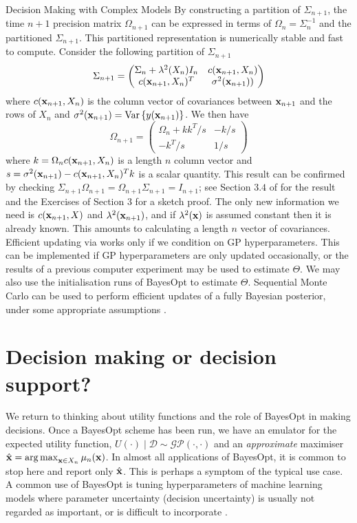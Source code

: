 \begin{chapter}{Decision Making with Complex Models \label{Chap:optimisation}}
By constructing a partition of $\Sigma_{n+1}$, the time $n+1$ precision matrix $\Omega_{n+1}$ can be expressed in terms of $\Omega_n = \Sigma_n^{-1}$ and the partitioned $\Sigma_{n+1}$. This partitioned representation is numerically stable and fast to compute. Consider the following partition of $\Sigma_{n+1}$
 \begin{equation}
 \Sigma_{n+1} = \begin{pmatrix}
         \Sigma_n + \lambda^2(X_n)I_n & c(\mathbf{x}_{n+1}, X_n) \\
         c(\mathbf{x}_{n+1}, X_n)^T & \sigma^2(\mathbf{x}_{n+1}))
         \end{pmatrix}
 \end{equation}
 where $c(\mathbf{x}_{n+1}, X_n)$ is the column vector of covariances between $\mathbf{x}_{n+1}$ and the rows of $X_n$ and $\sigma^2(\mathbf{x}_{n+1}) = \mathrm{Var}\,\{ y(\mathbf{x}_{n+1}) \}$. We then have
\begin{equation}
 \Omega_{n+1} = \begin{pmatrix}
         \Omega_n + k k^T /s & -k/s \\
         -k^T/s & 1/s
         \end{pmatrix} \label{Eq:omega-n1}
\end{equation}
where $k = \Omega_n c(\mathbf{x}_{n+1}, X_n)$ is a length $n$ column vector and $s = \sigma^2(\mathbf{x}_{n+1}) - c(\mathbf{x}_{n+1}, X_n)^T k$ is a scalar quantity. This result can be confirmed by checking $\Sigma_{n+1} \Omega_{n+1} = \Omega_{n+1} \Sigma_{n+1} = I_{n + 1}$; see Section $3.4$ of \citet{Gentle2007} for the result and the Exercises of Section $3$ for a sketch proof. The only new information we need is $c(\mathbf{x}_{n+1}, X)$ and $\lambda^2(\mathbf{x}_{n+1})$, and if $\lambda^2(\mathbf{x})$ is assumed constant then it is already known. This amounts to calculating a length $n$ vector of covariances. Efficient updating via  works only if we condition on GP hyperparameters. This can be implemented if GP hyperparameters are only updated occasionally, or the results of a previous computer experiment may be used to estimate $\Theta$. We may also use the initialisation runs of BayesOpt to estimate $\Theta$. Sequential Monte Carlo can be used to perform efficient updates of a fully Bayesian posterior, under some appropriate assumptions \citep{Gramacy2011}.
\section{Decision making or decision support?}
We return to thinking about utility functions and the role of BayesOpt in making decisions. Once a BayesOpt scheme has been run, we have an emulator for the expected utility function, $U(\cdot)\mid \mathcal{D} \sim \mathcal{GP}(\cdot, \cdot)$ and an \textit{approximate} maximiser $\hat{\mathbf{x}} = \operatorname*{arg\,max}_{\mathbf{x} \in X_n} \mu_n(\mathbf{x})$. In almost all applications of BayesOpt, it is common to stop here and report only $\hat{\mathbf{x}}$. This is perhaps a symptom of the typical use case. A common use of BayesOpt is tuning hyperparameters of machine learning models where parameter uncertainty (decision uncertainty) is usually not regarded as important, or is difficult to incorporate \citep{Bergstra2011, Swersky2013, Kim2020}.


\end{chapter}
